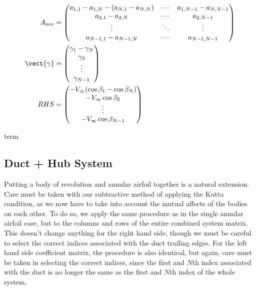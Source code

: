 \begin{align}
	A_{mn} &= \begin{pmatrix}
		a_{1,1}-a_{1,N} - (a_{N,1}-a_{N,N}) & \cdots  & a_{1,N-1}-a_{N,N-1} \\
		a_{2,1}- a_{2,N} & \cdots  & a_{2,N-1} \\
		\vdots & \ddots & \vdots \\
		a_{N-1,1}- a_{N-1,N} & \cdots  & a_{N-1,N-1} \\
	\end{pmatrix} \\
	\vect{\gamma} &= \begin{pmatrix}
		\gamma_1-\gamma_N \\
		\gamma_2 \\
		\vdots \\
		\gamma_{N-1} \\
	\end{pmatrix} \\
	RHS &= \begin{pmatrix}
		-V_\infty  (\cos\beta_{1}-\cos\beta_{N} ) \\
		-V_\infty \cos\beta_{2}  \\
		\vdots \\
		-V_\infty \cos\beta_{N-1} \\
	\end{pmatrix}
\end{align}



term\subsection{Duct + Hub System}
\label{ssec:ducthubsystem}

Putting a body of revolution and annular airfoil together is a natural extension.
Care must be taken with our subtractive method of applying the Kutta condition, as we now have to take into account the mutual affects of the bodies on each other.
To do so, we apply the same procedure as in the single annular airfoil case, but to the columns and rows of the entire combined system matrix.
This doesn't change anything for the right hand side, though we must be careful to select the correct indices associated with the duct trailing edges.
For the left hand side coefficient matrix, the procedure is also identical, but again, care must be taken in selecting the correct indices, since the first and \(N\)th index associated with the duct is no longer the same as the first and \(N\)th index of the whole system.

